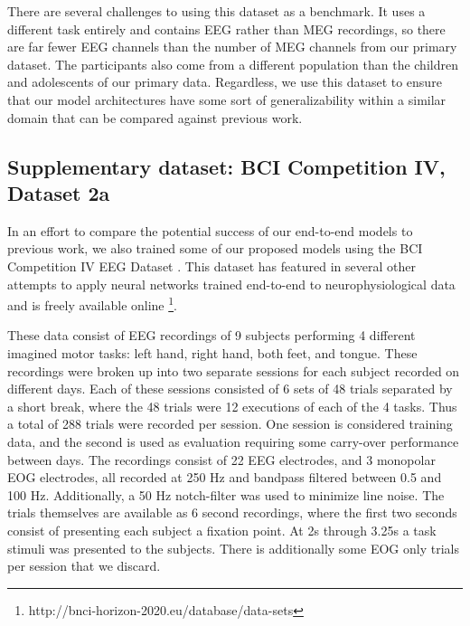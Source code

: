 \documentclass[fleqn,10pt]{wlscirep}
\begin{document}
There are several challenges to using this dataset as a benchmark. It uses a different task entirely and contains EEG rather than MEG recordings, so there are far fewer EEG channels than the number of MEG channels from our primary dataset. The participants also come from a different population than the children and adolescents of our primary data. Regardless, we use this dataset to ensure that our model architectures have some sort of generalizability within a similar domain that can be compared against previous work. 

\subsection*{Supplementary dataset: BCI Competition IV, Dataset 2a}

In an effort to compare the potential success of our end-to-end models to previous work, we also trained some of our proposed models using the BCI Competition IV EEG Dataset \cite{Tangermann2012}. This dataset has featured in several other attempts to apply neural networks trained end-to-end to neurophysiological data \cite{Schirrmeister2017,Tabar2017,Lawhern2017,Sun} and is freely available online \footnote{http://bnci-horizon-2020.eu/database/data-sets}.

These data consist of EEG recordings of 9 subjects performing 4 different imagined motor tasks: left hand, right hand, both feet, and tongue. These recordings were broken up into two separate sessions for each subject recorded on different days. Each of these sessions consisted of 6 sets of 48 trials separated by a short break, where the 48 trials were 12 executions of each of the 4 tasks. Thus a total of 288 trials were recorded per session. One session is considered training data, and the second is used as evaluation requiring some carry-over performance between days. The recordings consist of 22 EEG electrodes, and 3 monopolar EOG electrodes, all recorded at 250 Hz and bandpass filtered between 0.5 and 100 Hz. Additionally, a 50 Hz notch-filter was used to minimize line noise. The trials themselves are available as 6 second recordings, where the first two seconds consist of presenting each subject a fixation point. At 2s through 3.25s a task stimuli was presented to the subjects. There is additionally some EOG only trials per session that we discard. 

\end{document}
